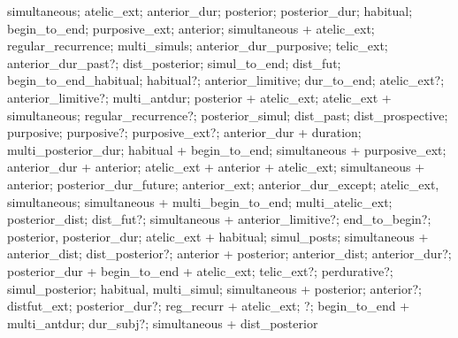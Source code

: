 simultaneous; atelic\_ext; anterior\_dur; posterior; posterior\_dur; habitual; begin\_to\_end; purposive\_ext; anterior; simultaneous + atelic\_ext; regular\_recurrence; multi\_simuls; anterior\_dur\_purposive; telic\_ext; anterior\_dur\_past?; dist\_posterior; simul\_to\_end; dist\_fut; begin\_to\_end\_habitual; habitual?; anterior\_limitive; dur\_to\_end; atelic\_ext?; anterior\_limitive?; multi\_antdur; posterior + atelic\_ext; atelic\_ext + simultaneous; regular\_recurrence?; posterior\_simul; dist\_past; dist\_prospective; purposive; purposive?; purposive\_ext?; anterior\_dur + duration; multi\_posterior\_dur; habitual + begin\_to\_end; simultaneous + purposive\_ext; anterior\_dur + anterior; atelic\_ext + anterior + atelic\_ext; simultaneous + anterior; posterior\_dur\_future; anterior\_ext; anterior\_dur\_except; atelic\_ext, simultaneous; simultaneous + multi\_begin\_to\_end; multi\_atelic\_ext; posterior\_dist; dist\_fut?; simultaneous + anterior\_limitive?; end\_to\_begin?; posterior, posterior\_dur; atelic\_ext + habitual; simul\_posts; simultaneous + anterior\_dist; dist\_posterior?; anterior + posterior; anterior\_dist; anterior\_dur?; posterior\_dur + begin\_to\_end + atelic\_ext; telic\_ext?; perdurative?; simul\_posterior; habitual, multi\_simul; simultaneous + posterior; anterior?; distfut\_ext; posterior\_dur?; reg\_recurr + atelic\_ext; ?; begin\_to\_end + multi\_antdur; dur\_subj?; simultaneous + dist\_posterior%